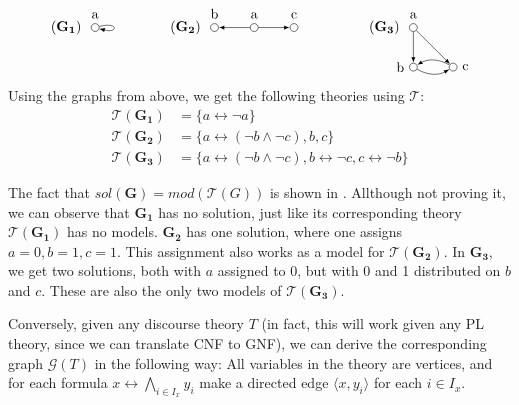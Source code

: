 \begin{example}\label{ex:3graphs}
  \[
    \begin{tikzpicture}
      [
      point/.style={circle,draw,inner sep=0pt,minimum size=2mm},
      collection/.style={thick,rectangle,draw,inner sep=0pt,minimum height=14mm, minimum width= 9mm}
      ]
      \node (label) at (0,1) [label=left:$(\mathbf{G_1})\;$] {};
      \node (0) at (0,1) [point,label=above:a] {};
      \draw [-latex, loop right] (0) to (0);

      \node (label) at (3,1) [label=left:$(\mathbf{G_2})\;$] {};
      \node (0) at (4,1) [point,label=above:a] {};
      \node (1) at (3,1) [point,label=above:b] {};
      \node (2) at (5,1) [point,label=above:c] {};
      \draw [-latex] (0) to (1);
      \draw [-latex] (0) to (2);

      \node (label) at (8,1) [label=left:$(\mathbf{G_3})\;$] {};
      \node (0) at (8,1) [point,label=above:a] {};
      \node (1) at (8,0) [point,label=left:b] {};
      \node (2) at (9,0) [point,label=right:c] {};
      \draw [-latex] (0) to (2);
      \draw [-latex] (0) to (1);
      \draw [-latex, bend right] (1) to (2);
      \draw [-latex, bend right] (2) to (1);
    \end{tikzpicture}
  \]
  Using the graphs from above, we get the following theories using $\mathcal{T}$:
  \begin{align}
    \mathcal{T}(\mathbf{G_1}) &= \big \{ a \leftrightarrow \neg a \big \} \\
    \mathcal{T}(\mathbf{G_2}) &= \big \{ a \leftrightarrow (\neg b \wedge \neg c), b, c \big \}\\
    \mathcal{T}(\mathbf{G_3}) &= \big \{ a \leftrightarrow (\neg b \wedge \neg c), b \leftrightarrow \neg c, c \leftrightarrow \neg b \big \}
  \end{align}

\end{example}
The fact that $sol(\mathbf{G}) = mod(\mathcal{T}(G))$ is shown in \cite{apal-digraph}.
Allthough not proving it, we can observe that $\mathbf{G_1}$ has no solution, just like its corresponding theory $\mathcal{T}(\mathbf{G_1})$ has no models.
$\mathbf{G_2}$ has one solution, where one assigns $a=0, b=1, c=1$.
This assignment also works as a model for $\mathcal{T}(\mathbf{G_2})$.
In $\mathbf{G_3}$, we get two solutions, both with $a$ assigned to 0, but with 0 and 1 distributed on $b$ and $c$.
These are also the only two models of $\mathcal{T}(\mathbf{G_3})$.

Conversely, given any discourse theory $T$ (in fact, this will work given any PL theory, since we can translate CNF to GNF), we can derive the corresponding graph $\mathcal{G}(T)$ in the following way:
All variables in the theory are vertices, and for each formula $x \leftrightarrow \bigwedge_{i \in I_x} y_i$ make a directed edge $\langle x,y_i \rangle$ for each $i \in I_x$.\\


